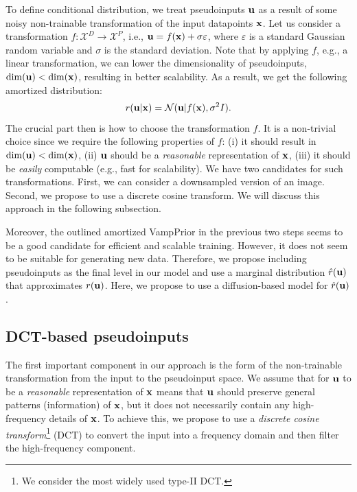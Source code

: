 To define conditional distribution, we treat pseudoinputs ${\mathbf{u}}$ as a result of some noisy non-trainable transformation of the input datapoints ${\mathbf{x}}$. 
Let us consider a transformation $f: \mathcal{X}^{D} \rightarrow \mathcal{X}^{P}$, i.e., ${\mathbf{u}} = f({\mathbf{x}}) + \sigma \varepsilon $, where $\varepsilon$ is a standard Gaussian random variable and $\sigma$ is the standard deviation. Note that by applying $f$, e.g., a linear transformation, we can lower the dimensionality of pseudoinputs, $\mathrm{dim}({\mathbf{u}}) < \mathrm{dim}({\mathbf{x}})$, resulting in better scalability. As a result, we get the following amortized distribution:
\begin{equation}\label{eq:amortized_vampprior_posterior}
    r(\rvu|\rvx) = \mathcal{N}(\rvu | f(\rvx), \sigma^2 I).
\end{equation}
The crucial part then is how to choose the transformation $f$. It is a non-trivial choice since we require the following properties of $f$: (i) it should result in $\mathrm{dim}({\mathbf{u}}) < \mathrm{dim}({\mathbf{x}})$, (ii) ${\mathbf{u}}$ should be a \textit{reasonable} representation of ${\mathbf{x}}$, (iii) it should be \textit{easily} computable (e.g., fast for scalability). We have two candidates for such transformations. First, we can consider a downsampled version of an image. Second, we propose to use a discrete cosine transform. We will discuss this approach in the following subsection.

Moreover, the outlined amortized VampPrior in the previous two steps seems to be a good candidate for efficient and scalable training. However, it does not seem to be suitable for generating new data. Therefore, we propose including pseudoinputs as the final level in our model and use a marginal distribution $\hat{r}({\mathbf{u}})$ that approximates $r({\mathbf{u}})$. Here, we propose to use a diffusion-based model for $\hat{r}({\mathbf{u}})$.


\subsection{DCT-based pseudoinputs}

The first important component in our approach is the form of the non-trainable transformation from the input to the pseudoinput space. We assume that for ${\mathbf{u}}$ to be a \textit{reasonable} representation of ${\mathbf{x}}$ means that ${\mathbf{u}}$ should preserve general patterns (information) of ${\mathbf{x}}$, but it does not necessarily contain any high-frequency details of ${\mathbf{x}}$. To achieve this, we propose to use a \textit{discrete cosine transform}\footnote{We consider the most widely used type-II DCT.} (DCT) to convert the input into a frequency domain and then filter the high-frequency component. 

